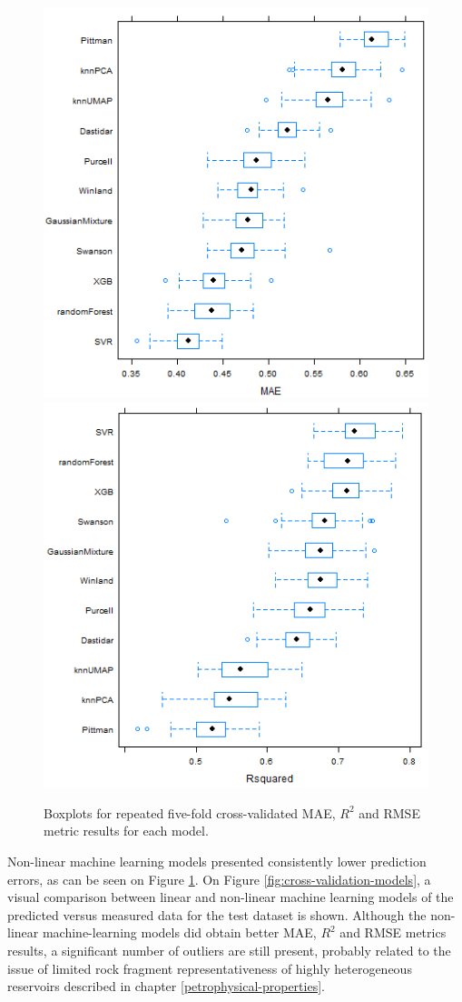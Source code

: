 \documentclass[english,msc,numbers]{coppe}
\begin{document}
  \begin{figure}
  
  {\centering \includegraphics[width=0.75\linewidth]{figure/3-12-cross-validation-MAE} \includegraphics[width=0.75\linewidth]{figure/3-12-cross-validation-R2} 
  
  }
  
  \caption{Boxplots for repeated five-fold cross-validated MAE, $R^2$ and RMSE metric results for each model.}\label{fig:cross-validation-metrics}
  \end{figure}
  Non-linear machine learning models presented consistently lower prediction errors, as can be seen on Figure \ref{fig:cross-validation-metrics}. On Figure \ref{fig:cross-validation-models}, a visual comparison between linear and non-linear machine learning models of the predicted versus measured data for the test dataset is shown. Although the non-linear machine-learning models did obtain better MAE, \(R^2\) and RMSE metrics results, a significant number of outliers are still present, probably related to the issue of limited rock fragment representativeness of highly heterogeneous reservoirs described in chapter \ref{petrophysical-properties}.
\end{document}
